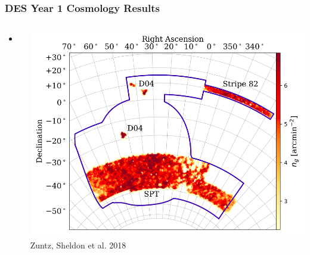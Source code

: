 \documentclass[aspectratio=169]{beamer}
\begin{document}
\frame
{

    \frametitle{DES Year 1 Cosmology Results}


    \begin{columns}
        \begin{column}{0.5\textwidth}
            \begin{itemize}

                \item blah

            \end{itemize}

        \end{column}
        \begin{column}{0.5\textwidth}
            \centering
                \includegraphics[width=\linewidth]{shearcat-fig2.png}
                \newline
                {\tiny Zuntz, Sheldon et al. 2018}
        \end{column}

    \end{columns}


}
\end{document}

